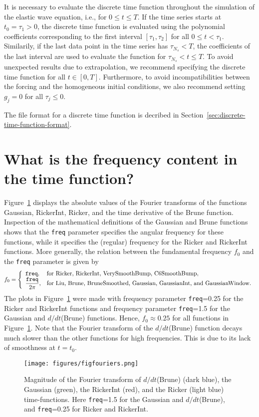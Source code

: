 \documentclass[11pt]{report}
\begin{document}
It is necessary to evaluate the discrete time function throughout the simulation of the elastic wave
equation, i.e., for $0\leq t\leq T$. If the time series starts at $t_0=\tau_1>0$, the discrete time
function is evaluated using the polynomial coefficients corresponding to the first interval
$[\tau_1,\tau_2]$ for all $0\leq t<\tau_1$. Similarily, if the last data point in the time series
has $\tau_{N_s}<T$, the coefficients of the last interval are used to evaluate the function for
$\tau_{N_s}<t\leq T$. To avoid unexpected results due to extrapolation, we recommend specifying the
discrete time function for all $t\in[0,T]$. Furthermore, to avoid incompatibilities between the
forcing and the homogeneous initial conditions, we also recommend setting $g_j=0$ for all
$\tau_j\leq 0$.

The file format for a discrete time function is decribed in
Section~\ref{sec:discrete-time-function-format}.


\section{What is the frequency content in the time function?}\label{sec:freq}

Figure~\ref{fig:fouriers} displays the absolute values of the Fourier transforms of the functions
Gaussian, RickerInt, Ricker, and the time derivative of the Brune function. Inspection of the
mathematical definitions of the Gaussian and Brune functions shows that the {\tt freq} parameter
specifies the angular frequency for these functions, while it specifies the (regular) frequency for
the Ricker and RickerInt functions. More generally, the relation between the fundamental frequency
$f_0$ and the {\tt freq} parameter is given by
\begin{equation}\label{eq:angular-scaling}
f_0 = \left\{ \begin{array}{ll}
 {\tt freq},& \mbox{for Ricker, RickerInt, VerySmoothBump, C6SmoothBump},\\
 \dfrac{\tt freq}{2\pi},& \mbox{for Liu, Brune, BruneSmoothed, Gaussian, GaussianInt, and GaussianWindow}.
\end{array}\right.
\end{equation}
The plots in Figure~\ref{fig:fouriers} were made with frequency parameter {\tt freq}=0.25 for the
Ricker and RickerInt functions and frequency parameter {\tt freq}=1.5 for the Gaussian and
$d/dt$(Brune) functions. Hence, $f_0\approx 0.25$ for all functions in
Figure~\ref{fig:fouriers}. Note that the Fourier transform of the $d/dt$(Brune) function decays much slower
than the other functions for high frequencies. This is due to its lack of smoothness at $t=t_0$.
\begin{figure}
\begin{center}
\texttt{[image: figures/figfouriers.png]}
\caption{ Magnitude of the Fourier transform of $d/dt$(Brune) (dark blue), the Gaussian (green), the
  RickerInt (red), and the Ricker (light blue) time-functions. Here {\tt freq}=1.5 for the Gaussian
  and $d/dt$(Brune), and {\tt freq}=0.25 for Ricker and RickerInt.}
\label{fig:fouriers}
\end{center}
\end{figure}
\end{document}

